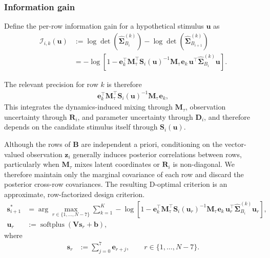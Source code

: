 \documentclass[11pt,letterpaper]{article} %
\begin{document}
\subsubsection*{Information gain}

Define the per-row information gain for a hypothetical stimulus $\bm{u}$ as
\begin{align*}
    \mathcal{I}_{i,k}(\bm{u})
    &:=
    \log\det
    \left(
        \hat{\bm{\Sigma}}_{B_i}^{(k)}
    \right)
    -
    \log\det
    \left(
        \hat{\bm{\Sigma}}_{B_{i+1}}^{(k)}
    \right) \\
    &=
    -\log\left[
        1
        -
        \bm{e}_k^\top
        \bm{M}_{\mathrm{\tau}}^\top
        \bm{S}_i(\bm{u})^{-1}
        \bm{M}_{\mathrm{\tau}}
        \bm{e}_k
        \,
        \bm{u}^\top
        \hat{\bm{\Sigma}}_{B_i}^{(k)}
        \bm{u}
    \right].
\end{align*}

The relevant precision for row $k$ is therefore
\begin{align*}
    \bm{e}_k^\top
    \bm{M}_{\mathrm{\tau}}^\top
    \bm{S}_i(\bm{u})^{-1}
    \bm{M}_{\mathrm{\tau}}
    \bm{e}_k,
\end{align*}
This integrates the dynamics-induced mixing through $\bm{M}_{\tau}$, observation uncertainty through $\bm{R}_i$, and parameter uncertainty through $\bm{D}_i$, and therefore depends on the candidate stimulus itself through $\bm{S}_i(\bm{u})$.

Although the rows of $\bm{B}$ are independent a priori, conditioning on the vector-valued observation $\bm{z}_i$ generally induces posterior correlations between rows, particularly when $\bm{M}_{\tau}$ mixes latent coordinates or $\bm{R}_i$ is non-diagonal. We therefore maintain only the marginal covariance of each row and discard the posterior cross-row covariances. The resulting D-optimal criterion is an approximate, row-factorized design criterion.
\begin{align*}
    \bm{s}_{i+1}^{*}
    &=
    \arg\max_{r\in\{1,\dots,N-7\}}
    \sum_{k=1}^{K}
    -
    \log\left[
        1
        -
        \bm{e}_k^\top
        \bm{M}_{\mathrm{\tau}}^\top
        \bm{S}_i(\bm{u}_r)^{-1}
        \bm{M}_{\mathrm{\tau}}
        \bm{e}_k
        \,
        \bm{u}_r^\top
        \hat{\bm{\Sigma}}_{B_i}^{(k)}
        \bm{u}_r
    \right],
    \\
    \bm{u}_r
    &:=
    \operatorname{softplus}
    \left(
        \bm{V}\bm{s}_r+\bm{b}
    \right),
\end{align*}
where
\begin{align*}
    \bm{s}_r
    &:=
    \sum_{j=0}^{7}\bm{e}_{r+j},
    \qquad
    r\in\{1,\dots,N-7\}.
\end{align*}
\end{document}

